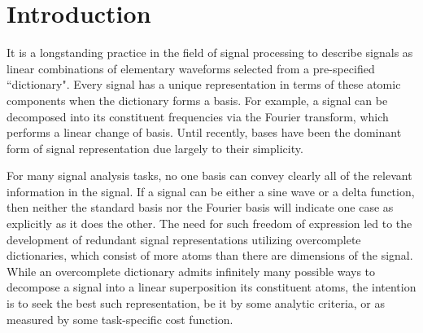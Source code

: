 \chapter{Introduction}\label{Intro}




It is a longstanding practice in the field of signal processing to describe signals as linear combinations of elementary waveforms selected from a pre-specified ``dictionary". Every signal has a unique representation in terms of these atomic components when the dictionary forms a basis. For example, a signal can be decomposed into its constituent frequencies via the Fourier transform, which performs a linear change of basis. %
Until recently, bases have been the dominant form of signal representation due largely to their simplicity. 

For many signal analysis tasks, no one basis can convey clearly all of the relevant information in the signal. If a signal can be either a sine wave or a delta function, then neither the standard basis nor the Fourier basis will indicate one case as explicitly as it does the other. 
The need for such freedom of expression led to the development of redundant signal representations utilizing overcomplete dictionaries, which consist of more atoms than there are dimensions of the signal. While an overcomplete dictionary admits infinitely many possible ways to decompose a signal into a linear superposition its constituent atoms, the intention is to seek the best such representation, be it by some analytic criteria, or as measured by some task-specific cost function. 

